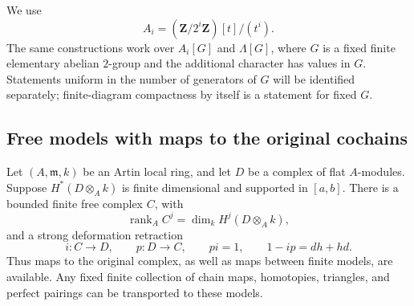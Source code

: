 We use
\[
 A_i=(\mathbf Z/2^i\mathbf Z)[t]/(t^i).
\]
The same constructions work over $A_i[G]$ and $\Lambda[G]$, where $G$ is a
fixed finite elementary abelian $2$-group and the additional character has
values in $G$.  Statements uniform in the number of generators of $G$ will
be identified separately; finite-diagram compactness by itself is a statement
for fixed $G$.

\subsection{Free models with maps to the original cochains}

\begin{lemma}\label{rl:finite-model}
Let $(A,\mathfrak m,k)$ be an Artin local ring, and let $D$ be a complex of
flat $A$-modules.  Suppose $H^*(D\otimes_A k)$ is finite dimensional and
supported in $[a,b]$.  There is a bounded finite free complex $C$, with
\[
 \operatorname{rank}_A C^j=\dim_k H^j(D\otimes_A k),
\]
and a strong deformation retraction
\[
 i:C\longrightarrow D,\qquad p:D\longrightarrow C,\qquad
 pi=1,\qquad 1-ip=dh+hd.
\]
Thus maps to the original complex, as well as maps between finite models,
are available.  Any fixed finite collection of chain maps, homotopies,
triangles, and perfect pairings can be transported to these models.
\end{lemma}

